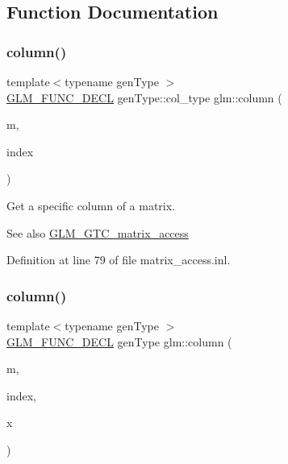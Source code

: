 \subsection{Function Documentation}
\mbox{\label{group__gtc__matrix__access_ga5c37fbeb062151f930e8a231c37e6b81}} 
\subsubsection{\texorpdfstring{column()}{column()}\hspace{0.1cm}{\footnotesize\ttfamily [1/2]}}
{\footnotesize\ttfamily template$<$typename gen\+Type $>$ \\
\hyperlink{setup_8hpp_ab2d052de21a70539923e9bcbf6e83a51}{G\+L\+M\+\_\+\+F\+U\+N\+C\+\_\+\+D\+E\+CL} gen\+Type\+::col\+\_\+type glm\+::column (\begin{DoxyParamCaption}\item[{gen\+Type const \&}]{m,  }\item[{\hyperlink{namespaceglm_a090a0de2260835bee80e71a702492ed9}{length\+\_\+t} const \&}]{index }\end{DoxyParamCaption})}

Get a specific column of a matrix. \begin{DoxySeeAlso}{See also}
\hyperlink{group__gtc__matrix__access}{G\+L\+M\+\_\+\+G\+T\+C\+\_\+matrix\+\_\+access} 
\end{DoxySeeAlso}


Definition at line 79 of file matrix\+\_\+access.\+inl.

\mbox{\label{group__gtc__matrix__access_gaff0c6f887deb04ce0519084d32aadb85}} 
\subsubsection{\texorpdfstring{column()}{column()}\hspace{0.1cm}{\footnotesize\ttfamily [2/2]}}
{\footnotesize\ttfamily template$<$typename gen\+Type $>$ \\
\hyperlink{setup_8hpp_ab2d052de21a70539923e9bcbf6e83a51}{G\+L\+M\+\_\+\+F\+U\+N\+C\+\_\+\+D\+E\+CL} gen\+Type glm\+::column (\begin{DoxyParamCaption}\item[{gen\+Type const \&}]{m,  }\item[{\hyperlink{namespaceglm_a090a0de2260835bee80e71a702492ed9}{length\+\_\+t} const \&}]{index,  }\item[{typename gen\+Type\+::col\+\_\+type const \&}]{x }\end{DoxyParamCaption})}

